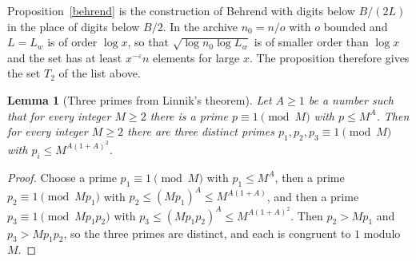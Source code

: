 \documentclass[11pt,letterpaper]{article}
\newtheorem{lemma}[theorem]{Lemma}
\numberwithin{equation}{section}
\begin{document}
Proposition~\ref{behrend} is the construction of Behrend \cite{behrend} with digits below $B/(2L)$ in the place of digits below $B/2$. In the archive $n_0=n/o$ with $o$ bounded and $L=L_w$ is of order $\log x$, so that $\sqrt{\log n_0\log L_w}$ is of smaller order than $\log x$ and the set has at least $x^{-\varepsilon}n$ elements for large $x$. The proposition therefore gives the set $T_2$ of the list above.

\begin{lemma}[Three primes from Linnik's theorem]\label{three}
Let $A\ge1$ be a number such that for every integer $M\ge2$ there is a prime $p\equiv1\pmod M$ with $p\le M^A$. Then for every integer $M\ge2$ there are three distinct primes $p_1,p_2,p_3\equiv1\pmod M$ with $p_i\le M^{A(1+A)^2}$.
\end{lemma}
\begin{proof}
Choose a prime $p_1\equiv1\pmod M$ with $p_1\le M^A$, then a prime $p_2\equiv1\pmod{Mp_1}$ with $p_2\le(Mp_1)^A\le M^{A(1+A)}$, and then a prime $p_3\equiv1\pmod{Mp_1p_2}$ with $p_3\le(Mp_1p_2)^A\le M^{A(1+A)^2}$. Then $p_2>Mp_1$ and $p_3>Mp_1p_2$, so the three primes are distinct, and each is congruent to $1$ modulo $M$.
\end{proof}
\end{document}
